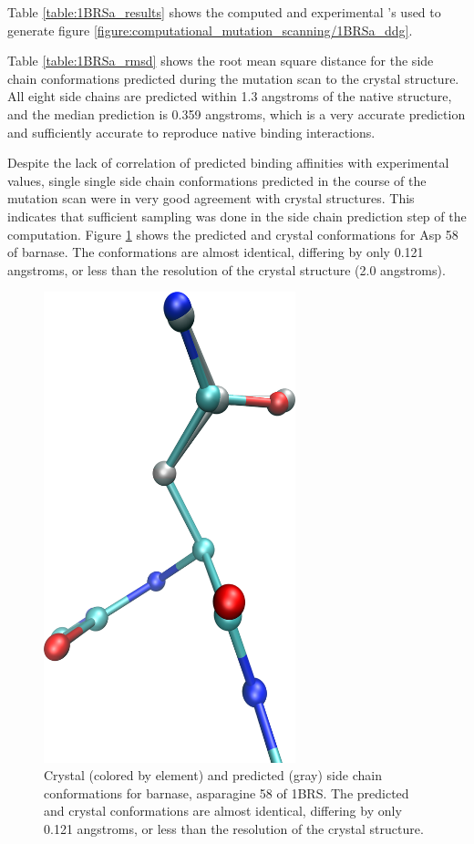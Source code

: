 Table \ref{table:1BRSa_results} shows the computed and experimental \ddg's used to generate figure \ref{figure:computational_mutation_scanning/1BRSa_ddg}.

Table \ref{table:1BRSa_rmsd} shows the root mean square distance for the side chain conformations predicted during the mutation scan to the crystal structure.
All eight side chains are predicted within 1.3 angstroms of the native structure, and the median prediction is 0.359 angstroms, which is a very accurate prediction and sufficiently accurate to reproduce native binding interactions.


Despite the lack of correlation of predicted binding affinities with experimental values, single single side chain conformations predicted in the course of the mutation scan were in very good agreement with crystal structures.
This indicates that sufficient sampling was done in the side chain prediction step of the computation.
Figure \ref{figure:computational_mutation_scanning/1brs_a_58} shows the predicted and crystal conformations for Asp 58 of barnase.
The conformations are almost identical, differing by only 0.121 angstroms, or less than the resolution of the crystal structure (2.0 angstroms).
\begin{figure}[h]
    \centering
    \includegraphics[width=0.65\textwidth,height=0.3\textheight,keepaspectratio]{figures/mutation_side_chain_images/1brs_chain_a_resid_58.png}
    \caption{Crystal (colored by element) and predicted (gray) side chain conformations for barnase, asparagine 58 of 1BRS.
    The predicted and crystal conformations are almost identical, differing by only 0.121 angstroms, or less than the resolution of the crystal structure.}
    \label{figure:computational_mutation_scanning/1brs_a_58}
\end{figure}
